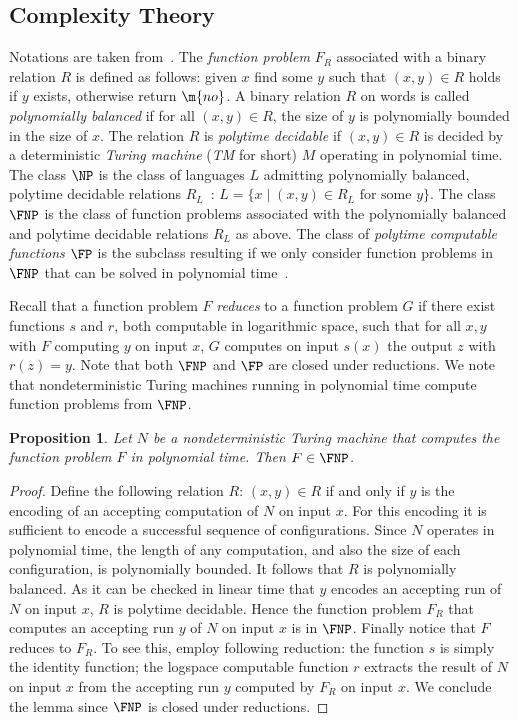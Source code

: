 \documentclass{LMCS}
\newtheorem{proposition}[thm]{Proposition}
\begin{document}
\subsection{Complexity Theory}

Notations are taken from~\cite{Papa}. 
The \emph{function problem} $F_R$ associated with a binary relation $R$
is defined as follows: given $x$ find some $y$ such that $(x,y) \in R$ holds if $y$ exists, 
otherwise return $\m{no}$. 
A binary relation $R$ on words is called \emph{polynomially balanced}
if for all $(x,y) \in R$, the size of $y$ is polynomially bounded in the 
size of $x$.
The relation $R$ is \emph{polytime decidable} if $(x,y) \in R$ 
is decided by a deterministic \emph{Turing machine} (\emph{TM} for short) $M$ operating in polynomial time.
The class $\NP$ is the class of languages $L$ admitting polynomially balanced, polytime decidable 
relations $R_L$~\cite[Chapter~9]{Papa}: $L =  \{x \mid (x,y) \in R_L \text{ for some $y$}\}$.
The class $\FNP$ is the class of function problems associated with the polynomially balanced and polytime decidable
relations $R_L$ as above.
The class of \emph{polytime computable functions} $\FP$ 
is the subclass resulting if we only consider function problems in $\FNP$ that 
can be solved in polynomial time~\cite[Chapter 10]{Papa}.

Recall that a function problem $F$ \emph{reduces} to a function problem $G$ if there 
exist functions $s$ and $r$, both computable in logarithmic space, such that 
for all $x,y$ with $F$ computing $y$ on input $x$, 
$G$ computes on input $s(x)$ the output $z$ with $r(z) = y$.
Note that both $\FNP$ and $\FP$ are closed under reductions.
We note that nondeterministic Turing machines running in polynomial time compute function 
problems from $\FNP$.
\begin{proposition}\label{p:fnp}
  Let $N$ be a nondeterministic Turing machine that computes the function problem $F$ in polynomial time.
  Then $F \in \FNP$.
\end{proposition}
\begin{proof}
  Define the following relation $R$: $(x,y) \in R$ if and only if $y$ 
  is the encoding of an accepting computation of $N$ on input $x$. For this encoding
  it is sufficient to encode a successful sequence of configurations. 
  Since $N$ operates in polynomial time, the length
  of any computation, 
  and also the size of each configuration, is polynomially bounded. 
  It follows that $R$ is polynomially balanced. 
  As it can be checked in linear time that $y$ encodes an accepting run of $N$ on input $x$, 
  $R$ is polytime decidable.
  Hence the function problem $F_R$ that computes an accepting run $y$ of $N$ on input $x$ is in $\FNP$.
  Finally notice that $F$ reduces to $F_R$.
  To see this, employ following reduction:
  the function $s$ is simply the identity function; the logspace computable function 
  $r$ extracts the result of $N$ on input $x$ 
  from the accepting run $y$ computed by $F_R$ on input $x$.
  We conclude the lemma since $\FNP$ is closed under reductions.
\end{proof}
\end{document}
